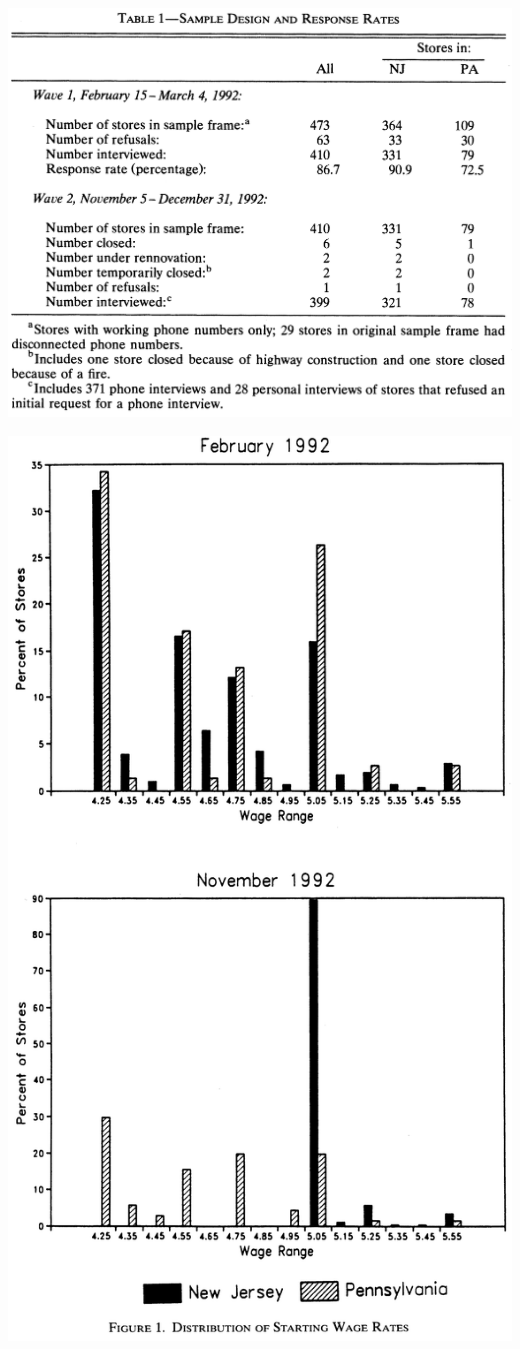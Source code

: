 \documentclass[
  letterpaper,
  DIV=11,
  numbers=noendperiod]{scrreprt}
\theoremstyle{definition}
\theoremstyle{remark}
\begin{document}
\begin{enumerate}
  \includegraphics{docs/images/diff-card-krueger-1994-tab1.png}

  \includegraphics{docs/images/diff-card-krueger-1994-fig1.png}


\end{enumerate}
\end{document}

